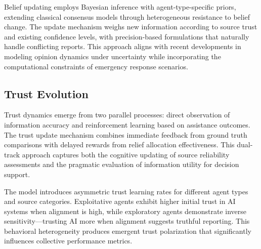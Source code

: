 \documentclass[pdflatex,sn-apa]{sn-jnl}%
\begin{document}

Belief updating employs Bayesian inference with agent-type-specific priors, extending classical consensus models through heterogeneous resistance to belief change. The update mechanism weighs new information according to source trust and existing confidence levels, with precision-based formulations that naturally handle conflicting reports. This approach aligns with recent developments in modeling opinion dynamics under uncertainty \citep{lorenz2017continuous} while incorporating the computational constraints of emergency response scenarios.

\subsection{Trust Evolution}

Trust dynamics emerge from two parallel processes: direct observation of information accuracy and reinforcement learning based on assistance outcomes. The trust update mechanism combines immediate feedback from ground truth comparisons with delayed rewards from relief allocation effectiveness. This dual-track approach captures both the cognitive updating of source reliability assessments and the pragmatic evaluation of information utility for decision support.

The model introduces asymmetric trust learning rates for different agent types and source categories. Exploitative agents exhibit higher initial trust in AI systems when alignment is high, while exploratory agents demonstrate inverse sensitivity—trusting AI more when alignment suggests truthful reporting. This behavioral heterogeneity produces emergent trust polarization that significantly influences collective performance metrics.
\end{document}
